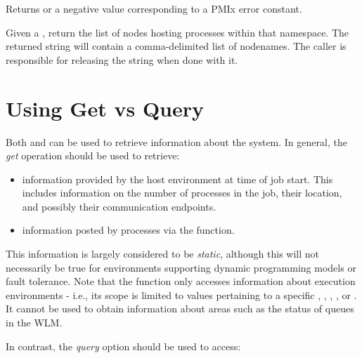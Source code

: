 \begin{arglist}
\end{arglist}

Returns  or a negative value corresponding to a PMIx error constant.

\descr

Given a , return the list of nodes hosting processes within that namespace.
The returned string will contain a comma-delimited list of nodenames.
The caller is responsible for releasing the string when done with it.



\section{Using Get vs Query}
\label{chap:api_job_mgmt:query}

Both  and  can be used to retrieve information about the system. In general, the \emph{get} operation should be used to retrieve:

\begin{itemize}
\item information provided by the host environment at time of job start. This includes information on the number of processes in the job, their location, and possibly their communication endpoints.
\item information posted by processes via the  function.
\end{itemize}

This information is largely considered to be \emph{static}, although this will not necessarily be true for environments supporting dynamic programming models or fault tolerance. Note that the  function only accesses information about execution environments - i.e., its scope is limited to values pertaining to a specific , , , , or . It cannot be used to obtain information about areas such as the status of queues in the \ac{WLM}.

In contrast, the \emph{query} option should be used to access:

